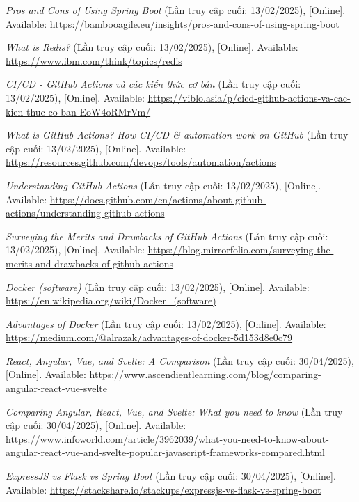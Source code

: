 \documentclass[12pt, a4paper]{article}
\begin{document}
\begin{thebibliography}{}
	 \textit{Pros and Cons of Using Spring Boot} (Lần truy cập cuối: 13/02/2025), [Online]. Available: \url{https://bambooagile.eu/insights/pros-and-cons-of-using-spring-boot}

	 \textit{What is Redis?} (Lần truy cập cuối: 13/02/2025), [Online]. Available: \url{https://www.ibm.com/think/topics/redis}


	 \textit{CI/CD - GitHub Actions và các kiến thức cơ bản} (Lần truy cập cuối: 13/02/2025), [Online]. Available: \url{https://viblo.asia/p/cicd-github-actions-va-cac-kien-thuc-co-ban-EoW4oRMrVm/}


	 \textit{What is GitHub Actions? How CI/CD \& automation work on GitHub} (Lần truy cập cuối: 13/02/2025), [Online]. Available: \url{https://resources.github.com/devops/tools/automation/actions}

	 \textit{Understanding GitHub Actions} (Lần truy cập cuối: 13/02/2025), [Online]. Available: \url{https://docs.github.com/en/actions/about-github-actions/understanding-github-actions}

	 \textit{Surveying the Merits and Drawbacks of GitHub Actions} (Lần truy cập cuối: 13/02/2025), [Online]. Available: \url{https://blog.mirrorfolio.com/surveying-the-merits-and-drawbacks-of-github-actions}

	 \textit{Docker (software)} (Lần truy cập cuối: 13/02/2025), [Online]. Available: \url{https://en.wikipedia.org/wiki/Docker\_(software)}

	 \textit{Advantages of Docker} (Lần truy cập cuối: 13/02/2025), [Online]. Available: \url{https://medium.com/@alrazak/advantages-of-docker-5d153d8e0c79}

	 \textit{React, Angular, Vue, and Svelte: A Comparison} (Lần truy cập cuối: 30/04/2025), [Online]. Available: \url{https://www.ascendientlearning.com/blog/comparing-angular-react-vue-svelte}

	 \textit{Comparing Angular, React, Vue, and Svelte: What you need to know} (Lần truy cập cuối: 30/04/2025), [Online]. Available: \url{https://www.infoworld.com/article/3962039/what-you-need-to-know-about-angular-react-vue-and-svelte-popular-javascript-frameworks-compared.html}

	 \textit{ExpressJS vs Flask vs Spring Boot} (Lần truy cập cuối: 30/04/2025), [Online]. Available: \url{https://stackshare.io/stackups/expressjs-vs-flask-vs-spring-boot}


\end{thebibliography}
\end{document}

